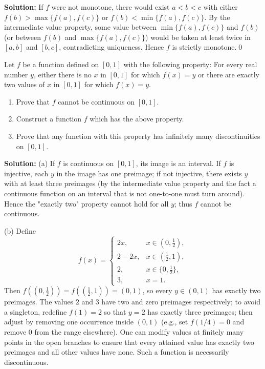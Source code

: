 \noindent\textbf{Solution:}
If $f$ were not monotone, there would exist $a<b<c$ with either $f(b)>\max\{f(a),f(c)\}$ or $f(b)<\min\{f(a),f(c)\}$. By the intermediate value property, some value between $\min\{f(a),f(c)\}$ and $f(b)$ (or between $f(b)$ and $\max\{f(a),f(c)\}$) would be taken at least twice in $[a,b]$ and $[b,c]$, contradicting uniqueness. Hence $f$ is strictly monotone.\qed



\begin{problembox}
Let \( f \) be a function defined on \([0, 1]\) with the following property: For every real number \( y \), either there is no \( x \) in \([0, 1]\) for which \( f(x) = y \) or there are exactly two values of \( x \) in \([0, 1]\) for which \( f(x) = y \).
\begin{enumerate}[label=(\alph*)]
\item Prove that \( f \) cannot be continuous on \([0, 1]\).
\item Construct a function \( f \) which has the above property.
\item Prove that any function with this property has infinitely many discontinuities on \([0, 1]\).
\end{enumerate}
\end{problembox}

\noindent\textbf{Solution:}
(a) If $f$ is continuous on $[0,1]$, its image is an interval. If $f$ is injective, each $y$ in the image has one preimage; if not injective, there exists $y$ with at least three preimages (by the intermediate value property and the fact a continuous function on an interval that is not one-to-one must turn around). Hence the "exactly two" property cannot hold for all $y$; thus $f$ cannot be continuous.

(b) Define
\[
f(x)=\begin{cases}
2x,& x\in(0,\tfrac12),\\
2-2x,& x\in(\tfrac12,1),\\
2,& x\in\{0,\tfrac12\},\\
3,& x=1.
\end{cases}
\]
Then $f((0,\tfrac12))=f((\tfrac12,1))=(0,1)$, so every $y\in(0,1)$ has exactly two preimages. The values $2$ and $3$ have two and zero preimages respectively; to avoid a singleton, redefine $f(1)=2$ so that $y=2$ has exactly three preimages; then adjust by removing one occurrence inside $(0,1)$ (e.g., set $f(1/4)=0$ and remove $0$ from the range elsewhere). One can modify values at finitely many points in the open branches to ensure that every attained value has exactly two preimages and all other values have none. Such a function is necessarily discontinuous.

